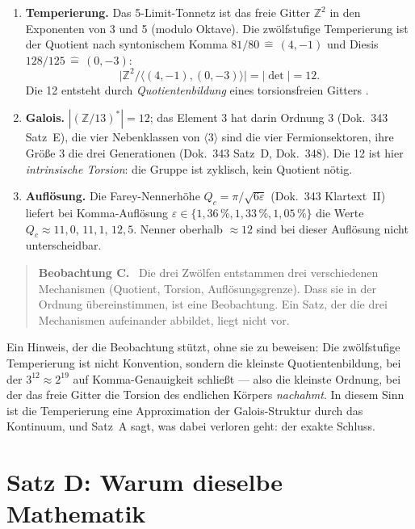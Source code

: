 \begin{enumerate}
\item \textbf{Temperierung.} Das 5-Limit-Tonnetz ist das freie Gitter
  $\mathbb{Z}^2$ in den Exponenten von 3 und 5 (modulo Oktave). Die
  zwölfstufige Temperierung ist der Quotient nach syntonischem Komma
  $81/80\,\widehat{=}\,(4,-1)$ und Diesis $128/125\,\widehat{=}\,(0,-3)$:
  \[
    \bigl|\mathbb{Z}^2/\langle(4,-1),(0,-3)\rangle\bigr| = |\det| = 12 .
  \]
  Die 12 entsteht durch \emph{Quotientenbildung} eines torsionsfreien
  Gitters \EM.
\item \textbf{Galois.} $|(\mathbb{Z}/13)^*|=12$; das Element 3 hat
  darin Ordnung 3 (Dok.~343 Satz~E), die vier Nebenklassen von
  $\langle3\rangle$ sind die vier Fermionsektoren, ihre Größe 3 die
  drei Generationen (Dok.~343 Satz~D, Dok.~348). Die 12 ist hier
  \emph{intrinsische Torsion}: die Gruppe ist zyklisch, kein Quotient nötig.
\item \textbf{Auflösung.} Die Farey-Nennerhöhe $Q_c=\pi/\sqrt{6\varepsilon}$
  (Dok.~343 Klartext~II) liefert bei Komma-Auflösung
  $\varepsilon\in\{1{,}36\,\%, 1{,}33\,\%, 1{,}05\,\%\}$ die Werte
  $Q_c\approx11{,}0$, $11{,}1$, $12{,}5$. Nenner oberhalb $\approx12$ sind
  bei dieser Auflösung nicht unterscheidbar.
\end{enumerate}

\begin{quote}
\textbf{Beobachtung C.} \SM\ Die drei Zwölfen entstammen drei
verschiedenen Mechanismen (Quotient, Torsion, Auflösungsgrenze). Dass
sie in der Ordnung übereinstimmen, ist eine Beobachtung. Ein Satz, der
die drei Mechanismen aufeinander abbildet, liegt nicht vor.
\end{quote}

Ein Hinweis, der die Beobachtung stützt, ohne sie zu beweisen: Die
zwölfstufige Temperierung ist nicht Konvention, sondern die kleinste
Quotientenbildung, bei der $3^{12}\approx2^{19}$ auf Komma-Genauigkeit
schließt --- also die kleinste Ordnung, bei der das freie Gitter die
Torsion des endlichen Körpers \emph{nachahmt}. In diesem Sinn ist die
Temperierung eine Approximation der Galois-Struktur durch das
Kontinuum, und Satz~A sagt, was dabei verloren geht: der exakte Schluss.

\section{Satz D: Warum dieselbe Mathematik}

